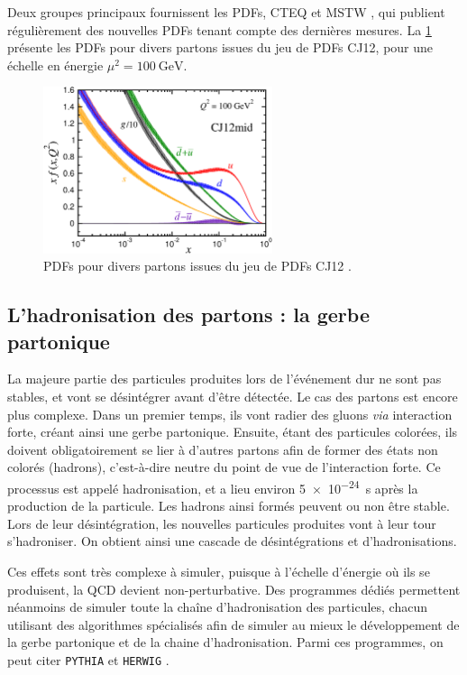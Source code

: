 \smallskip

Deux groupes principaux fournissent les PDFs, CTEQ \citep{Owens:2012bv} et MSTW \citep{Martin:2009iq}, qui publient régulièrement des nouvelles PDFs tenant compte des dernières mesures. La \cref{fig:cj12} présente les PDFs pour divers partons issues du jeu de PDFs CJ12, pour une échelle en énergie $\mu^2 = \SI{100}{\GeV}$.

\begin{figure}[tbp]
  \centering
  \includegraphics[width=0.6\textwidth]{chapitre3/figs/Fx_errl.pdf}
  \caption{PDFs pour divers partons issues du jeu de PDFs CJ12 \citep{Owens:2012bv}.}
  \label{fig:cj12}
\end{figure}


\subsection{L'hadronisation des partons : la gerbe partonique}

La majeure partie des particules produites lors de l'événement dur ne sont pas stables, et vont se désintégrer avant d'être détectée. Le cas des partons est encore plus complexe. Dans un premier temps, ils vont radier des gluons \emph{via} interaction forte, créant ainsi une gerbe partonique. Ensuite, étant des particules colorées, ils doivent obligatoirement se lier à d'autres partons afin de former des états non colorés (hadrons), c'est-à-dire neutre du point de vue de l'interaction forte. Ce processus est appelé hadronisation, et a lieu environ \SI{5e-24}{\s} après la production de la particule. Les hadrons ainsi formés peuvent ou non être stable. Lors de leur désintégration, les nouvelles particules produites vont à leur tour s'hadroniser. On obtient ainsi une cascade de désintégrations et d'hadronisations.

Ces effets sont très complexe à simuler, puisque à l'échelle d'énergie où ils se produisent, la QCD devient non-perturbative. Des programmes dédiés permettent néanmoins de simuler toute la chaîne d'hadronisation des particules, chacun utilisant des algorithmes spécialisés afin de simuler au mieux le développement de la gerbe partonique et de la chaine d'hadronisation. Parmi ces programmes, on peut citer \texttt{PYTHIA} \citep{pythia} et \texttt{HERWIG} \citep{Corcella:2000bw}.

